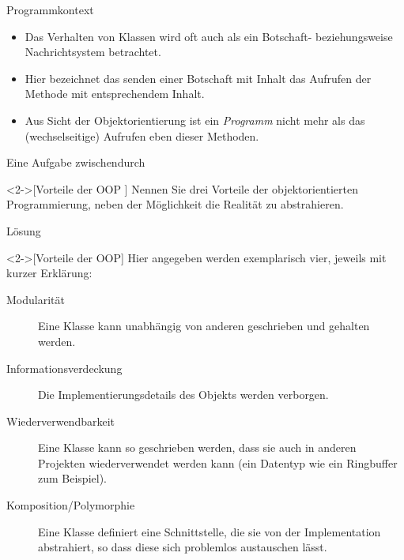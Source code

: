 \begin{frame}{Programmkontext}
    \begin{itemize}[<+(1)->]
        \widei
        \item Das Verhalten von Klassen wird oft auch als ein Botschaft- beziehungsweise Nachrichtsystem betrachtet.
        \item Hier bezeichnet das senden einer Botschaft\pause{} mit Inhalt das Aufrufen der Methode mit entsprechendem Inhalt.
        \item Aus Sicht der Objektorientierung ist ein \emph{Programm}\pause{} nicht mehr als das (wechselseitige) Aufrufen eben dieser Methoden.
    \end{itemize}
\end{frame}

\ifull
\begin{frame}[c]{Eine Aufgabe zwischendurch}
    \begin{exercise}<2->[Vorteile der OOP ]
        Nennen Sie drei Vorteile der objektorientierten Programmierung,\pause{} neben der Möglichkeit die Realität zu abstrahieren.
    \end{exercise}
\end{frame}

\begin{frame}[c]{Lösung}
    \begin{solve}<2->[Vorteile der OOP]
        Hier angegeben werden exemplarisch vier, jeweils mit kurzer Erklärung:\begin{description}
            \item[Modularität] Eine Klasse kann unabhängig von anderen geschrieben und gehalten werden.
            \item[Informationsverdeckung] Die Implementierungsdetails des Objekts werden verborgen.
            \item[Wiederverwendbarkeit] Eine Klasse kann so geschrieben werden, dass sie auch in anderen Projekten wiederverwendet werden kann\pause{} (ein Datentyp wie ein Ringbuffer zum Beispiel).
            \item[Komposition/Polymorphie] Eine Klasse definiert eine Schnittstelle, die sie von der Implementation abstrahiert,\pause{} so dass diese sich problemlos austauschen lässt.
        \end{description}
    \end{solve}
\end{frame}
\fi

